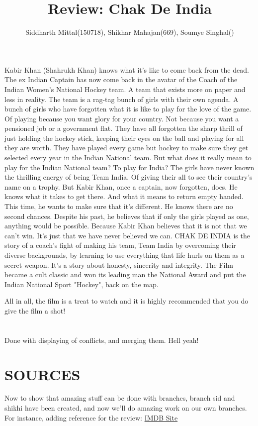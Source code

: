 \documentclass[titlepage]{article}
\title{Review: Chak De India}
\author{Siddharth Mittal(150718), Shikhar Mahajan(669), Soumye Singhal()}
\begin{document}
\maketitle

\section*{}
Kabir Khan (Shahrukh Khan) knows what it's like to come back from the dead. The ex Indian Captain has now come back in the avatar of the Coach of the Indian Women's National Hockey team. A team that exists more on paper and less in reality. The team is a rag-tag bunch of girls with their own agenda. A bunch of girls who have forgotten what it is like to play for the love of the game. Of playing because you want glory for your country. Not because you want a pensioned job or a government flat. They have all forgotten the sharp thrill of just holding the hockey stick, keeping their eyes on the ball and playing for all they are worth. They have played every game but hockey to make sure they get selected every year in the Indian National team. But what does it really mean to play for the Indian National team? To play for India? The girls have never known the thrilling energy of being Team India. Of giving their all to see their country's name on a trophy. But Kabir Khan, once a captain, now forgotten, does. He knows what it takes to get there. And what it means to return empty handed. This time, he wants to make sure that it's different. He knows there are no second chances. Despite his past, he believes that if only the girls played as one, anything would be possible. Because Kabir Khan believes that it is not that we can't win. It's just that we have never believed we can. CHAK DE INDIA is the story of a coach's fight of making his team, Team India by overcoming their diverse backgrounds, by learning to use everything that life hurls on them as a secret weapon. It's a story about honesty, sincerity and integrity. The Film became a cult classic and won its leading man the National Award and put the Indian National Sport "Hockey", back on the map.

All in all, the film is a treat to watch and it is highly recommended that you do give the film a shot!
\section*{}
Done with displaying of conflicts, and merging them. Hell yeah!

\section*{SOURCES}
Now to show that amazing stuff can be done with branches, branch sid and shikhi have been created, and now we'll do amazing work on our own branches.
For instance, adding reference for the review: \href{http://www.imdb.com/title/tt0871510/plotsummary}{IMDB Site}
\end{document}
